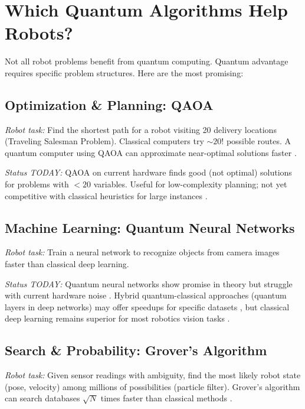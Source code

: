 \documentclass[conference]{IEEEtran}
\begin{document}
\section{Which Quantum Algorithms Help Robots?}

Not all robot problems benefit from quantum computing. Quantum advantage requires specific problem structures. Here are the most promising:

\subsection{Optimization \& Planning: QAOA}

\textit{Robot task:} Find the shortest path for a robot visiting 20 delivery locations (Traveling Salesman Problem). Classical computers try $\sim20!$ possible routes. A quantum computer using QAOA can approximate near-optimal solutions faster \cite{b15, b16}.

\textit{Status TODAY:} QAOA on current hardware finds good (not optimal) solutions for problems with $<20$ variables. Useful for low-complexity planning; not yet competitive with classical heuristics for large instances \cite{b17, b18, b3}.

\subsection{Machine Learning: Quantum Neural Networks}

\textit{Robot task:} Train a neural network to recognize objects from camera images faster than classical deep learning.

\textit{Status TODAY:} Quantum neural networks show promise in theory but struggle with current hardware noise \cite{b19, b20, b21}. Hybrid quantum-classical approaches (quantum layers in deep networks) may offer speedups for specific datasets \cite{b22, b23, b24}, but classical deep learning remains superior for most robotics vision tasks \cite{b25, b26, b27}.

\subsection{Search \& Probability: Grover's Algorithm}

\textit{Robot task:} Given sensor readings with ambiguity, find the most likely robot state (pose, velocity) among millions of possibilities (particle filter). Grover's algorithm can search databases $\sqrt{N}$ times faster than classical methods \cite{b28, b29}.
\end{document}
